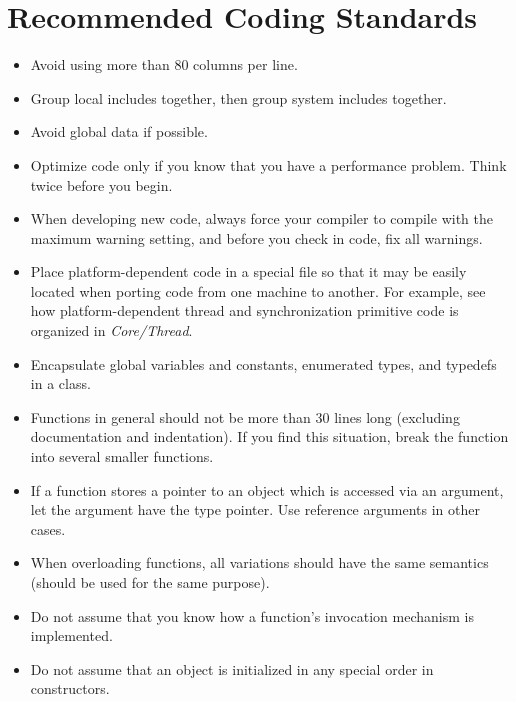\documentclass[fleqn,12pt,openany]{book}
\begin{document}
\section{Recommended Coding Standards}
\begin{itemize}

\item
Avoid using more than 80 columns per line. 

\item
Group local includes together, then group system includes together. 

\item
Avoid global data if possible. 

\item
Optimize code only if you know that you have a performance problem.
Think twice before you begin. 

\item
When developing new code, always force your compiler to compile with the maximum
warning setting, and before you check in code, fix all warnings. 

\item
Place platform-dependent code in a special file so that it may be easily located
when porting code from one machine to another.
For example, see how platform-dependent thread and synchronization primitive code is organized in \emph{Core/Thread}.

\item
Encapsulate global variables and constants, enumerated types, and typedefs in a class. 

\item
Functions in general should not be more than 30 lines long
(excluding documentation and indentation).
If you find this situation, break the function into several smaller functions.

\item
If a function stores a pointer to an object which is accessed via an argument,
let the argument have the type pointer.
Use reference arguments in other cases. 

\item
When overloading functions, all variations should have the same semantics
(should be used for the same purpose). 

\item
Do not assume that you know how a function's invocation mechanism is implemented. 

\item
Do not assume that an object is initialized in any special order in constructors. 


\end{itemize}
\end{document}
